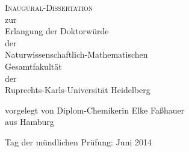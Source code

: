 \documentclass{scrartcl}
\begin{document}
\begin{center}
 \LARGE{\textsc{{Inaugural-Dissertation}}\\[5ex]
        zur\\ Erlangung der Doktorwürde\\
        der\\ Naturwissenschaftlich-Mathematischen\\
        Gesamtfakultät\\
        der\\
        Ruprechts-Karls-Universität
        Heidelberg
         }

\vfill
\Large
vorgelegt von Diplom-Chemikerin Elke Faßhauer\\
aus Hamburg

\vspace{5ex}
Tag der mündlichen Prüfung: Juni 2014

\end{center}
\end{document}
